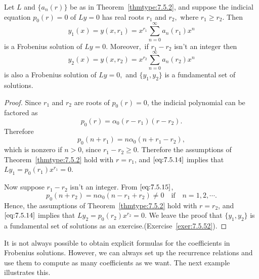 \documentclass{ximera}
\begin{document}
\begin{theorem}\label{thmtype:7.5.3}
Let $L$ and $\{a_n(r)\}$ be as in Theorem~\ref{thmtype:7.5.2}, and suppose the
indicial equation $p_0(r)=0$ of $Ly=0$ has real roots $r_1$ and $r_2,$
where $r_1\geq r_2.$ Then
$$
y_1(x)=y(x,r_1)=x^{r_1}\sum_{n=0}^\infty a_n(r_1)x^n
$$
is a Frobenius solution of $Ly=0$. Moreover$,$ if $r_1-r_2$ isn't  an
integer then
$$
y_2(x)=y(x,r_2)=x^{r_2}\sum_{n=0}^\infty a_n(r_2)x^n
$$
is also a Frobenius solution of $Ly=0,$
and $\{y_1,y_2\}$ is a fundamental set of solutions.
\end{theorem}

\begin{proof}
Since $r_1$ and $r_2$ are roots of $p_0(r)=0$, the indicial polynomial
can be factored as
\begin{equation} \label{eq:7.5.15}
p_0(r)=\alpha_0(r-r_1)(r-r_2).
\end{equation}
Therefore
$$
p_0(n+r_1)=n\alpha_0(n+r_1-r_2),
$$
which is nonzero if $n>0$, since $r_1-r_2\geq0$. Therefore the
assumptions of Theorem~\ref{thmtype:7.5.2} hold with $r=r_1$, and
$\eqref{eq:7.5.14}$ implies that $Ly_1=p_0(r_1)x^{r_1}=0$.

Now suppose $r_1-r_2$ isn't  an integer. From $\eqref{eq:7.5.15}$,
$$
p_0(n+r_2)=n\alpha_0(n-r_1+r_2)\neq 0\quad\mbox{if}\quad n=1,2,\cdots.
$$
Hence, the assumptions of Theorem~\ref{thmtype:7.5.2} hold with $r=r_2$,
and $\eqref{eq:7.5.14}$ implies that $Ly_2=p_0(r_2)x^{r_2}=0$. We leave the
proof that $\{y_1,y_2\}$ is a fundamental set of solutions as an exercise.(Exercise~\ref{exer:7.5.52}).
\end{proof}

It is not  always possible to obtain explicit formulas for the
coefficients in Frobenius solutions. However, we can always set up the
recurrence relations and use them to compute as many coefficients as we
want. The next example illustrates this.
\end{document}
